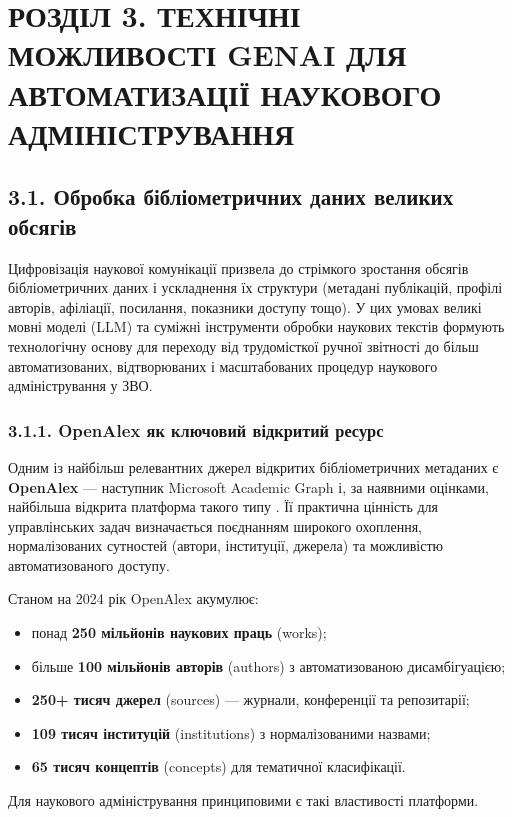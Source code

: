 \section*{РОЗДІЛ 3. ТЕХНІЧНІ МОЖЛИВОСТІ GENAI ДЛЯ АВТОМАТИЗАЦІЇ НАУКОВОГО АДМІНІСТРУВАННЯ}

\subsection*{3.1. Обробка бібліометричних даних великих обсягів}

Цифровізація наукової комунікації призвела до стрімкого зростання обсягів бібліометричних даних і ускладнення їх структури (метадані публікацій, профілі авторів, афіліації, посилання, показники доступу тощо). У цих умовах великі мовні моделі (LLM) та суміжні інструменти обробки наукових текстів формують технологічну основу для переходу від трудомісткої ручної звітності до більш автоматизованих, відтворюваних і масштабованих процедур наукового адміністрування у ЗВО.

\subsubsection*{3.1.1. OpenAlex як ключовий відкритий ресурс}

Одним із найбільш релевантних джерел відкритих бібліометричних метаданих є \textbf{OpenAlex} --- наступник Microsoft Academic Graph і, за наявними оцінками, найбільша відкрита платформа такого типу \cite{Priem2022OpenAlex,OpenAlex2024Docs}. Її практична цінність для управлінських задач визначається поєднанням широкого охоплення, нормалізованих сутностей (автори, інституції, джерела) та можливістю автоматизованого доступу.

Станом на 2024 рік OpenAlex акумулює:
\begin{itemize}[leftmargin=*,itemsep=0.2em]
\item понад \textbf{250 мільйонів наукових праць} (works);
\item більше \textbf{100 мільйонів авторів} (authors) з автоматизованою дисамбігуацією;
\item \textbf{250+ тисяч джерел} (sources) --- журнали, конференції та репозитарії;
\item \textbf{109 тисяч інституцій} (institutions) з нормалізованими назвами;
\item \textbf{65 тисяч концептів} (concepts) для тематичної класифікації.
\end{itemize}

Для наукового адміністрування принциповими є такі властивості платформи.

